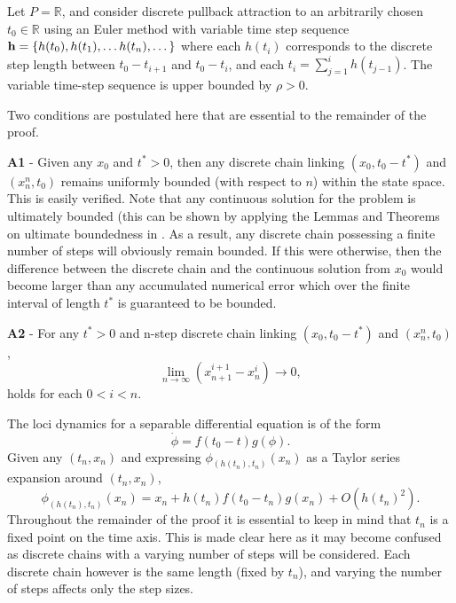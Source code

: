 \begin{prf}
Let $P = \mathbb{R}$, and consider discrete pullback attraction to an
arbitrarily chosen $t_0 \in \mathbb{R}$ using an Euler method with variable time
step sequence ${\bf h} = \{ h(t_0), h(t_1), \dots h(t_n), \dots \}$ where each
$h(t_i)$ corresponds to the discrete step length between $t_0 - t_{i+1}$ and
$t_0 - t_i$, and each $t_i = \sum_{j=1}^i h(t_{j-1})$. The variable time-step
sequence is upper bounded by $\rho > 0$.

Two conditions are postulated here that are essential to the
remainder of the proof.

\textbf{A1} - Given any $x_0$ and $t^* > 0$, then any discrete
chain linking $(x_0, t_0 - t^*)$ and $(x_n^n, t_0)$ remains uniformly bounded
(with respect to $n$) within the state space. This is easily verified.
Note that any continuous solution for the problem is ultimately bounded (this
can be shown by applying the Lemmas and Theorems on ultimate boundedness in
\cite{LaLe67,Yo59}. As a result, any discrete chain possessing a finite number
of steps will obviously remain bounded. If this were otherwise, then the
difference between the discrete chain and the continuous solution from $x_0$
would become larger than any accumulated numerical error which over the finite
interval of length $t^*$ is guaranteed to be bounded.

\textbf{A2} - For any $t^*  > 0$ and n-step discrete chain linking
$(x_0, t_0 - t^*)$ and $(x_n^n, t_0)$,
\[ \lim_{n \to \infty} (x_{n+1}^{i+1} - x_{n}^i ) \to 0, \]
holds for each $0 <  i < n$.

The loci dynamics for a separable differential equation is of the
form
\[ \dot{\phi} = f(t_0 - t) g( \phi ). \]
Given any $(t_n, x_n)$ and expressing $\phi_{(h(t_n), t_n)}(x_n)$ as a Taylor
series expansion around $(t_n, x_n)$,
\begin{equation}\label{eqsdslte1}
  \phi_{(h(t_n), t_n)}(x_n) = x_n + h(t_n) f(t_0 - t_n) g( x_n ) + O(h(t_n)^2).
\end{equation}
Throughout the remainder of the proof it is essential to keep in mind that
$t_n$ is a fixed point on the time axis. This is made clear here as it may
become confused as discrete chains with a varying number of steps will be
considered. Each discrete chain however is the same length (fixed by $t_n$), and
varying the number of steps affects only the step sizes.


\end{prf}
